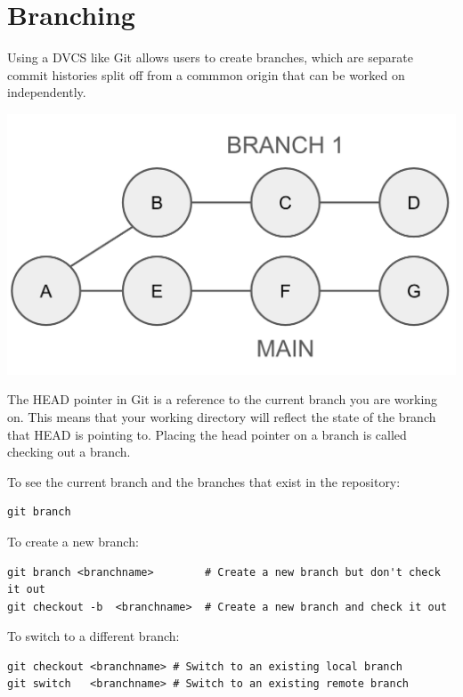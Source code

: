 \documentclass[fleqn]{article}
\begin{document}
\pagebreak

\section*{Branching}

Using a DVCS like Git allows users to create branches, which are separate
commit histories split off from a commmon origin that can be worked on
independently. 

\begin{center}
    \includegraphics[scale=0.3]{branch.png}
\end{center}

The HEAD pointer in Git is a reference to the current branch you are working on.
This means that your working directory will reflect the state of the branch
that HEAD is pointing to. Placing the head pointer on a branch is called
checking out a branch.

To see the current branch and the branches that exist in the repository:

\begin{lstlisting}
git branch
\end{lstlisting}

To create a new branch:

\begin{lstlisting}
git branch <branchname>        # Create a new branch but don't check it out
git checkout -b  <branchname>  # Create a new branch and check it out
\end{lstlisting}

To switch to a different branch:

\begin{lstlisting}
git checkout <branchname> # Switch to an existing local branch
git switch   <branchname> # Switch to an existing remote branch
\end{lstlisting}
\end{document}
